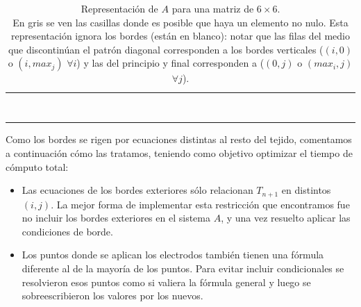 \documentclass[a4paper]{article}
\begin{document}
\begin{table}
\begin{tabular}{|l|l|l|l|l|l|l|l|l|l|l|l|l|l|l|l|l|l|l|l|l|l|l|l|l|l|l|l|l|l|l|l|l|l|l|l|}
 & & & & & & & & & & & & & & & & & & & & & \cellcolor{mygray} & & & & & \cellcolor{mygray} & \cellcolor{mygray} & \cellcolor{mygray} & & & & & \cellcolor{mygray} & & \\ \hline 
 & & & & & & & & & & & & & & & & & & & & & & \cellcolor{mygray} & & & & & \cellcolor{mygray} & \cellcolor{mygray} & \cellcolor{mygray} & & & & & \cellcolor{mygray} & \\ \hline 
 & & & & & & & & & & & & & & & & & & & & & & & & & & & & & & & & & & & \\ \hline 
 & & & & & & & & & & & & & & & & & & & & & & & & & & & & & & & & & & & \\ \hline 
 & & & & & & & & & & & & & & & & & & & & & & & & & & & & & & & & & & & \\ \hline 
 & & & & & & & & & & & & & & & & & & & & & & & & & & & & & & & & & & & \\ \hline 
 & & & & & & & & & & & & & & & & & & & & & & & & & & & & & & & & & & & \\ \hline 
 & & & & & & & & & & & & & & & & & & & & & & & & & & & & & & & & & & & \\ \hline 
 & & & & & & & & & & & & & & & & & & & & & & & & & & & & & & & & & & & \\ \hline
\end{tabular}
\caption{Representación de $A$ para una matriz de $6\times6$. \\ En gris se ven las casillas donde es posible que haya un elemento no nulo. Esta representación ignora los bordes (están en blanco): notar que las filas del medio que discontinúan el patrón diagonal corresponden a los bordes verticales ($(i,0)$ o $(i,max_j)$ $\forall i$) y las del principio y final corresponden a ($(0,j)$ o $(max_i,j)$ $\forall j$). }
\label{table:matriz_a}
\end{table}

Como los bordes se rigen por ecuaciones distintas al resto del tejido, comentamos a continuación
cómo las tratamos, teniendo como objetivo optimizar el tiempo de cómputo total:
\begin{itemize}
\item Las ecuaciones de los bordes exteriores sólo
relacionan $T_{n+1}$ en distintos $(i,j)$. La mejor forma de implementar esta
restricción que encontramos fue no incluir los bordes exteriores en el sistema $A$, y una vez
resuelto aplicar las condiciones de borde.
\item Los puntos donde se aplican los electrodos también tienen una 
fórmula diferente al de la mayoría de los puntos. Para evitar incluir 
condicionales se resolvieron esos puntos como si valiera la fórmula general
y luego se sobreescribieron los valores por los nuevos.
\end{itemize}
\end{document}
